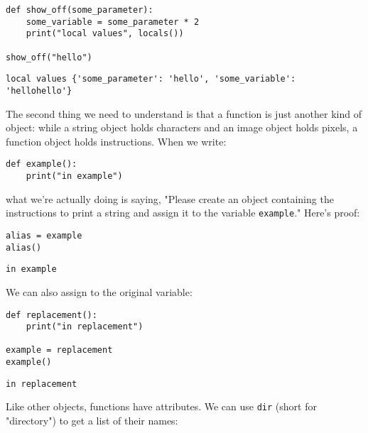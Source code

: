 \documentclass{scrbook}
\begin{document}
\begin{lstlisting}[frame=single,frameround=tttt]
def show_off(some_parameter):
    some_variable = some_parameter * 2
    print("local values", locals())

show_off("hello")
\end{lstlisting}

\begin{lstlisting}[frame=single,frameround=tttt]
local values {'some_parameter': 'hello', 'some_variable': 'hellohello'}
\end{lstlisting}



The second thing we need to understand is that
a function is just another kind of object:
while a string object holds characters
and an image object holds pixels,
a function object holds instructions.
When we write:

\begin{lstlisting}[frame=single,frameround=tttt]
def example():
    print("in example")
\end{lstlisting}


what we're actually doing is saying,
"Please create an object containing the instructions to print a string
and assign it to the variable \texttt{example}."
Here's proof:


\begin{lstlisting}[frame=single,frameround=tttt]
alias = example
alias()
\end{lstlisting}

\begin{lstlisting}[frame=single,frameround=tttt]
in example
\end{lstlisting}



We can also assign to the original variable:


\begin{lstlisting}[frame=single,frameround=tttt]
def replacement():
    print("in replacement")

example = replacement
example()
\end{lstlisting}

\begin{lstlisting}[frame=single,frameround=tttt]
in replacement
\end{lstlisting}



Like other objects,
functions have attributes.
We can use \texttt{dir} (short for "directory") to get a list of their names:
\end{document}
